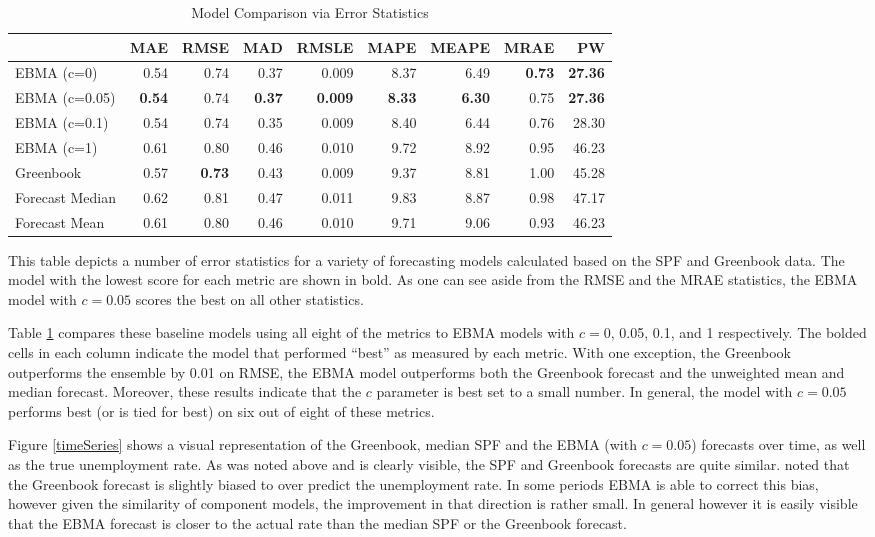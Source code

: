 \documentclass[12pt,fullpage,endnotes]{article}
\begin{document}
\begin{table}[h]
\caption{Model Comparison via Error Statistics}
\begin{center}
\begin{tabular}{lrrrrrrrr}
\toprule
 & MAE & RMSE & MAD & RMSLE & MAPE & MEAPE & MRAE & PW \\ 
\midrule
 EBMA (c=0)& 0.54 & 0.74 & 0.37 & 0.009 & 8.37 & 6.49 & \textbf{0.73} & \textbf{27.36} \\ 
  EBMA (c=0.05)& \textbf{0.54} & 0.74 &\textbf{ 0.37} & \textbf{0.009} & \textbf{8.33} & \textbf{6.30} & 0.75 & \textbf{27.36} \\ 
 EBMA (c=0.1)& 0.54 & 0.74 & 0.35 & 0.009 & 8.40 & 6.44 & 0.76 & 28.30 \\ 
EBMA (c=1) & 0.61 & 0.80 & 0.46 & 0.010 & 9.72 & 8.92 & 0.95 & 46.23 \\ 
 Greenbook& 0.57 & \textbf{0.73} & 0.43 & 0.009 & 9.37 & 8.81 & 1.00 & 45.28 \\ 
 Forecast Median& 0.62 & 0.81 & 0.47 & 0.011 & 9.83 & 8.87 & 0.98 & 47.17 \\ 
Forecast Mean& 0.61 & 0.80 & 0.46 & 0.010 & 9.71 & 9.06 & 0.93 & 46.23 \\ 
\bottomrule
\end{tabular}
\end{center}

\label{compareTable1}
This table depicts a number of error statistics for a variety of forecasting models calculated based on the SPF and Greenbook data. The model with the lowest score for each metric are shown in bold. As one can see aside from the RMSE and the MRAE statistics, the EBMA model with $c=0.05$ scores the best on all other statistics. 
\end{table}

Table \ref{compareTable1} compares these baseline models using all
eight of the metrics to EBMA models with $c=$0, 0.05, 0.1, and 1
respectively.  The bolded cells in each column indicate the model that
performed ``best'' as measured by each metric.  With one exception,
the Greenbook outperforms the ensemble by 0.01 on RMSE, the EBMA model
outperforms both the Greenbook forecast and the unweighted mean and
median forecast.  Moreover, these results indicate that the $c$
parameter is best set to a small number.  In general, the model with
$c=0.05$ performs best (or is tied for best) on six out of eight of
these metrics.

Figure \ref{timeSeries} shows a visual representation of the Greenbook, median SPF and the EBMA (with $c=0.05$) forecasts over time, as well as the true unemployment rate. As was noted above and is clearly visible, the SPF and Greenbook forecasts are quite similar. \citet{Baghestani:2008} noted that the Greenbook forecast is slightly biased to over predict the unemployment rate. In some periods EBMA is able to correct this bias, however given the similarity of component models, the improvement in that direction is rather small. In general however it is easily visible that the EBMA forecast is closer to the actual rate than the median SPF or the Greenbook forecast.
\end{document}
